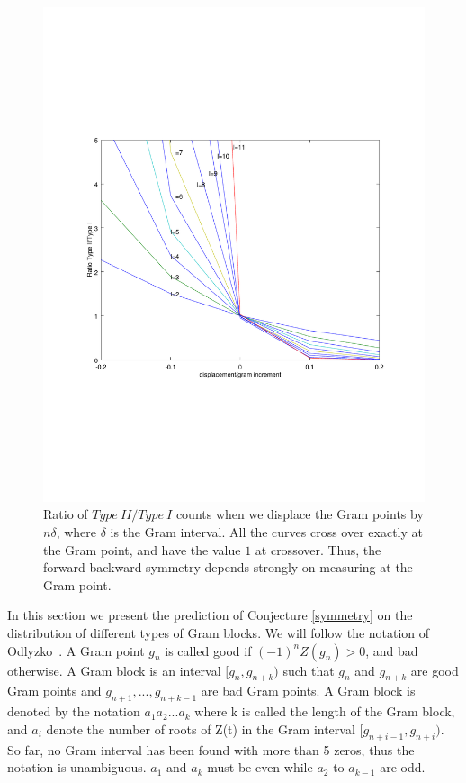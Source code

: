 \documentclass[twoside]{article}
\begin{document}
\begin{figure}
\centering
\includegraphics[width=1.1\textwidth]{typeIIratio}
\caption[]{ 
  Ratio of $Type~II/Type~I$ counts when we displace the Gram points by $n\delta$, where $\delta$ is the Gram interval. All the curves cross over exactly at the Gram point, and have the value $1$ at crossover. Thus, the forward-backward symmetry depends strongly on measuring at the Gram point.
 }
\vspace{1mm}
\label{typeIIratio}
\end{figure}

In this section we present the prediction of  Conjecture \ref{symmetry} on the distribution of different types of Gram blocks. We will follow the notation of   Odlyzko~\cite{Odlyzko(1992)}. A Gram point $g_n$ is called good if $(-1)^nZ(g_n) > 0$, and bad otherwise. A Gram block is an interval $[g_n, g_{n+k})$ such that $g_n$  and $g_{n+k}$ are good Gram points 
and $g_{n+1}, . . ., g_{n+k-1}$ are bad Gram points. A Gram block is denoted by the notation $a_1a_2 . . . a_k$ where k is called the length of the Gram block, and $a_i$ denote the number of roots of Z(t) in the Gram interval $[g_{n+i-1}, g_{n+i})$. So far, no Gram interval has been found with more than 5 zeros, thus the notation is unambiguous. $a_1$ and $a_k$ must be even while  $a_2$ to $a_{k-1}$ are odd.
\end{document}
